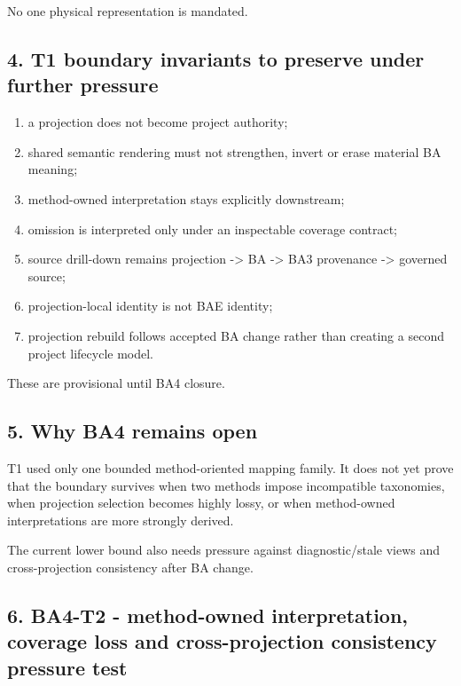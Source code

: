 \documentclass[11pt,a4paper]{article}
\providecommand{\tightlist}{\setlength{\itemsep}{0pt}\setlength{\parskip}{0pt}}
\begin{document}
No one physical representation is mandated.

\subsection{4. T1 boundary invariants to preserve under further pressure}\label{4-t1-boundary-invariants-to-preserve-under-further-pressure}

\begin{enumerate}
\def\labelenumi{\arabic{enumi}.}
\tightlist
\item
  a projection does not become project authority;
\item
  shared semantic rendering must not strengthen, invert or erase material BA meaning;
\item
  method-owned interpretation stays explicitly downstream;
\item
  omission is interpreted only under an inspectable coverage contract;
\item
  source drill-down remains projection -\textgreater{} BA -\textgreater{} BA3 provenance -\textgreater{} governed source;
\item
  projection-local identity is not BAE identity;
\item
  projection rebuild follows accepted BA change rather than creating a second project lifecycle model.
\end{enumerate}

These are provisional until BA4 closure.

\subsection{5. Why BA4 remains open}\label{5-why-ba4-remains-open}

T1 used only one bounded method-oriented mapping family. It does not yet prove that the boundary survives when two methods impose incompatible taxonomies, when projection selection becomes highly lossy, or when method-owned interpretations are more strongly derived.

The current lower bound also needs pressure against diagnostic/stale views and cross-projection consistency after BA change.

\subsection{6. BA4-T2 - method-owned interpretation, coverage loss and cross-projection consistency pressure test}\label{6-ba4-t2---method-owned-interpretation-coverage-loss-and-cross-projection-consistency-pressure-test}
\end{document}
